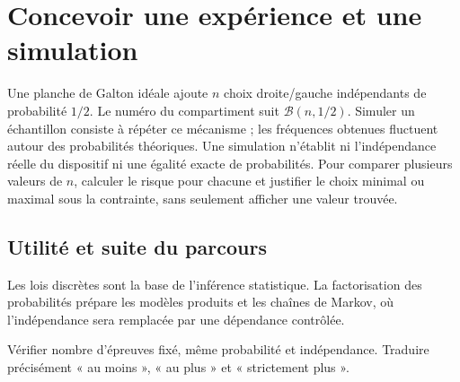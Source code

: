 \documentclass[../cours_tle.tex]{subfiles}
\begin{document}
\section{Concevoir une expérience et une simulation}
Une planche de Galton idéale ajoute $n$ choix droite/gauche indépendants de probabilité $1/2$. Le numéro du compartiment suit $\mathcal B(n,1/2)$.
Simuler un échantillon consiste à répéter ce mécanisme ; les fréquences obtenues fluctuent autour des probabilités théoriques. Une simulation n'établit ni l'indépendance réelle du dispositif ni une égalité exacte de probabilités.
Pour comparer plusieurs valeurs de $n$, calculer le risque pour chacune et justifier le choix minimal ou maximal sous la contrainte, sans seulement afficher une valeur trouvée.
\begin{finchapitre}
\section{Utilité et suite du parcours}
Les lois discrètes sont la base de l'inférence statistique. La factorisation des probabilités prépare les modèles produits et les chaînes de Markov, où l'indépendance sera remplacée par une dépendance contrôlée.
\begin{retenir}
Vérifier nombre d'épreuves fixé, même probabilité et indépendance. Traduire précisément « au moins », « au plus » et « strictement plus ».
\end{retenir}
\end{finchapitre}
\end{document}
